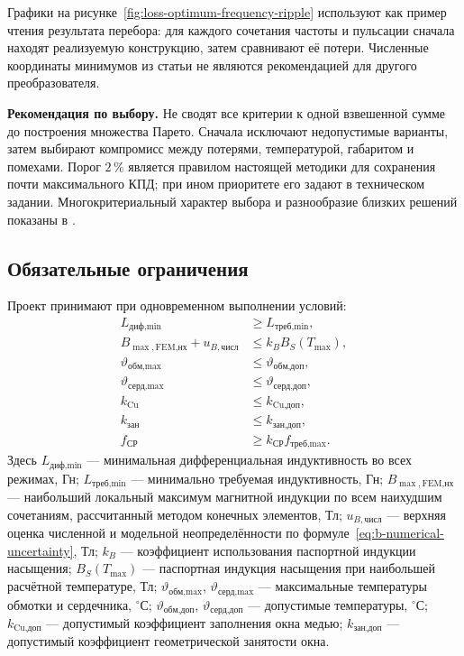 \documentclass[14pt,a4paper]{extarticle}
\newcommand{\recommend}{\par\noindent\textbf{Рекомендация по выбору.} }
\begin{document}
Графики на рисунке~\ref{fig:loss-optimum-frequency-ripple} используют как
пример чтения результата перебора: для каждого сочетания частоты и
пульсации сначала находят реализуемую конструкцию, затем сравнивают её
потери. Численные координаты минимумов из статьи не являются рекомендацией
для другого преобразователя.

\recommend Не сводят все критерии к одной взвешенной сумме до
построения множества Парето. Сначала исключают недопустимые варианты,
затем выбирают компромисс между потерями, температурой, габаритом и
помехами. Порог $2\,\%$ является правилом настоящей методики для сохранения
почти максимального КПД; при ином приоритете его задают в техническом
задании. Многокритериальный характер выбора и разнообразие близких решений
показаны в \cite{papamanolis,pichon}.

\subsection{Обязательные ограничения}
\label{subsec:mandatory-constraints}

Проект принимают при одновременном выполнении условий:
\begin{align}
 L_{\text{диф,min}}&\geq L_{\text{треб,min}},
 \label{eq:constraint-l}\\
 B_{\max,\text{FEM,нх}}+u_{B,\text{числ}}
 &\leq k_BB_S(T_{\max}),
 \label{eq:acceptance-b-fem}\\
 \vartheta_{\text{обм,max}}&\leq\vartheta_{\text{обм,доп}},
 \label{eq:constraint-tw}\\
 \vartheta_{\text{серд,max}}&\leq\vartheta_{\text{серд,доп}},
 \label{eq:constraint-tc}\\
 k_{\text{Cu}}&\leq k_{\text{Cu,доп}},
 \label{eq:constraint-kw}\\
 k_{\text{зан}}&\leq k_{\text{зан,доп}},
 \label{eq:constraint-kocc}\\
 f_{\text{СР}}&\geq k_{\text{СР}}f_{\text{треб,max}}.
 \label{eq:constraint-srf}
\end{align}
Здесь $L_{\text{диф,min}}$ --- минимальная дифференциальная
индуктивность во всех режимах, Гн;
$L_{\text{треб,min}}$ --- минимально требуемая индуктивность, Гн;
$B_{\max,\text{FEM,нх}}$ --- наибольший локальный максимум магнитной
индукции по всем наихудшим сочетаниям, рассчитанный методом конечных
элементов, Тл;
$u_{B,\text{числ}}$ --- верхняя оценка численной и модельной
неопределённости по формуле~\eqref{eq:b-numerical-uncertainty}, Тл;
$k_B$ --- коэффициент использования паспортной индукции насыщения;
$B_S(T_{\max})$ --- паспортная индукция насыщения при наибольшей расчётной
температуре, Тл;
$\vartheta_{\text{обм,max}}$, $\vartheta_{\text{серд,max}}$ ---
максимальные температуры обмотки и сердечника, $^{\circ}\text{С}$;
$\vartheta_{\text{обм,доп}}$, $\vartheta_{\text{серд,доп}}$ ---
допустимые температуры, $^{\circ}\text{С}$;
$k_{\text{Cu,доп}}$ --- допустимый коэффициент заполнения окна медью;
$k_{\text{зан,доп}}$ --- допустимый коэффициент геометрической занятости
окна.
\end{document}
